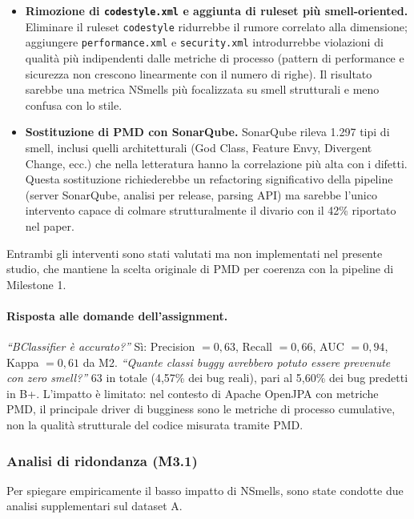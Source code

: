 \begin{itemize}
  \item \textbf{Rimozione di \texttt{codestyle.xml} e aggiunta di ruleset più smell-oriented.}
  Eliminare il ruleset \texttt{codestyle} ridurrebbe il rumore correlato alla dimensione;
  aggiungere \texttt{performance.xml} e \texttt{security.xml} introdurrebbe violazioni di
  qualità più indipendenti dalle metriche di processo (pattern di performance e sicurezza non
  crescono linearmente con il numero di righe). Il risultato sarebbe una metrica NSmells più
  focalizzata su smell strutturali e meno confusa con lo stile.

  \item \textbf{Sostituzione di PMD con SonarQube.}
  SonarQube rileva 1.297 tipi di smell, inclusi quelli architetturali (God Class, Feature
  Envy, Divergent Change, ecc.) che nella letteratura hanno la correlazione più alta con i
  difetti. Questa sostituzione richiederebbe un refactoring significativo della pipeline
  (server SonarQube, analisi per release, parsing API) ma sarebbe l'unico intervento capace
  di colmare strutturalmente il divario con il 42\% riportato nel paper.
\end{itemize}

Entrambi gli interventi sono stati valutati ma non implementati nel presente studio,
che mantiene la scelta originale di PMD per coerenza con la pipeline di Milestone 1.

\paragraph{Risposta alle domande dell'assignment.}
\textit{``BClassifier è accurato?''} Sì: Precision $= 0{,}63$, Recall $= 0{,}66$,
AUC $= 0{,}94$, Kappa $= 0{,}61$ da M2.
\textit{``Quante classi buggy avrebbero potuto essere prevenute con zero smell?''}
63 in totale (4,57\% dei bug reali), pari al 5,60\% dei bug predetti in B+.
L'impatto è limitato: nel contesto di Apache OpenJPA con metriche PMD, il principale
driver di bugginess sono le metriche di processo cumulative, non la qualità strutturale
del codice misurata tramite PMD.

\subsubsection{Analisi di ridondanza (M3.1)}

Per spiegare empiricamente il basso impatto di NSmells, sono state condotte due analisi
supplementari sul dataset A.

